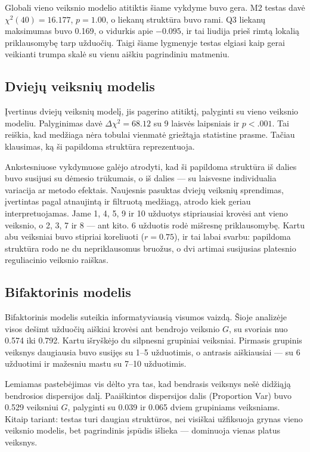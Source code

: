 \documentclass[11pt,a4paper]{article}
\begin{document}
Globali vieno veiksnio modelio atitiktis šiame vykdyme buvo gera. M2 testas davė $\chi^2(40)=16.177$, $p=1.00$, o liekanų struktūra buvo rami. Q3 liekanų maksimumas buvo 0.169, o vidurkis apie $-0.095$, ir tai liudija prieš rimtą lokalią priklausomybę tarp užduočių. Taigi šiame lygmenyje testas elgiasi kaip gerai veikianti trumpa skalė su vienu aiškiu pagrindiniu matmeniu.

\subsection{Dviejų veiksnių modelis}
Įvertinus dviejų veiksnių modelį, jis pagerino atitiktį, palyginti su vieno veiksnio modeliu. Palyginimas davė $\Delta \chi^2 = 68.12$ su 9 laisvės laipsniais ir $p < .001$. Tai reiškia, kad medžiaga nėra tobulai vienmatė griežtąja statistine prasme. Tačiau klausimas, ką ši papildoma struktūra reprezentuoja.

Ankstesniuose vykdymuose galėjo atrodyti, kad ši papildoma struktūra iš dalies buvo susijusi su dėmesio trūkumais, o iš dalies — su laisvesne individualia variacija ar metodo efektais. Naujesnis pasuktas dviejų veiksnių sprendimas, įvertintas pagal atnaujintą ir filtruotą medžiagą, atrodo kiek geriau interpretuojamas. Jame 1, 4, 5, 9 ir 10 užduotys stipriausiai krovėsi ant vieno veiksnio, o 2, 3, 7 ir 8 — ant kito. 6 užduotis rodė mišresnę priklausomybę. Kartu abu veiksniai buvo stipriai koreliuoti ($r = 0.75$), ir tai labai svarbu: papildoma struktūra rodo ne du nepriklausomus bruožus, o dvi artimai susijusias platesnio reguliacinio veiksnio raiškas.

\subsection{Bifaktorinis modelis}
Bifaktorinis modelis suteikia informatyviausią visumos vaizdą. Šioje analizėje visos dešimt užduočių aiškiai krovėsi ant bendrojo veiksnio $G$, su svoriais nuo 0.574 iki 0.792. Kartu išryškėjo du silpnesni grupiniai veiksniai. Pirmasis grupinis veiksnys daugiausia buvo susijęs su 1--5 užduotimis, o antrasis aiškiausiai — su 6 užduotimi ir mažesniu mastu su 7--10 užduotimis.

Lemiamas pastebėjimas vis dėlto yra tas, kad bendrasis veiksnys nešė didžiąją bendrosios dispersijos dalį. Paaiškintos dispersijos dalis (Proportion Var) buvo 0.529 veiksniui $G$, palyginti su 0.039 ir 0.065 dviem grupiniams veiksniams. Kitaip tariant: testas turi daugiau struktūros, nei visiškai užfiksuoja grynas vieno veiksnio modelis, bet pagrindinis įspūdis išlieka — dominuoja vienas platus veiksnys.
\end{document}
